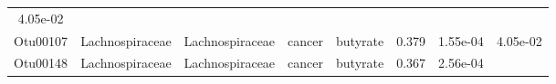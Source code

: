\documentclass[11pt,]{article}
\begin{document}
\begin{longtable}[]{@{}cccccccc@{}}
\begin{minipage}[t]{0.08\columnwidth}
4.05e-02\strut
\end{minipage}\tabularnewline
\begin{minipage}[t]{0.08\columnwidth}\centering\strut
Otu00107\strut
\end{minipage} & \begin{minipage}[t]{0.15\columnwidth}\centering\strut
Lachnospiraceae\strut
\end{minipage} & \begin{minipage}[t]{0.15\columnwidth}\centering\strut
Lachnospiraceae\strut
\end{minipage} & \begin{minipage}[t]{0.08\columnwidth}\centering\strut
cancer\strut
\end{minipage} & \begin{minipage}[t]{0.09\columnwidth}\centering\strut
butyrate\strut
\end{minipage} & \begin{minipage}[t]{0.07\columnwidth}\centering\strut
0.379\strut
\end{minipage} & \begin{minipage}[t]{0.08\columnwidth}\centering\strut
1.55e-04\strut
\end{minipage} & \begin{minipage}[t]{0.08\columnwidth}\centering\strut
4.05e-02\strut
\end{minipage}\tabularnewline
\begin{minipage}[t]{0.08\columnwidth}\centering\strut
Otu00148\strut
\end{minipage} & \begin{minipage}[t]{0.15\columnwidth}\centering\strut
Lachnospiraceae\strut
\end{minipage} & \begin{minipage}[t]{0.15\columnwidth}\centering\strut
Lachnospiraceae\strut
\end{minipage} & \begin{minipage}[t]{0.08\columnwidth}\centering\strut
cancer\strut
\end{minipage} & \begin{minipage}[t]{0.09\columnwidth}\centering\strut
butyrate\strut
\end{minipage} & \begin{minipage}[t]{0.07\columnwidth}\centering\strut
0.367\strut
\end{minipage} & \begin{minipage}[t]{0.08\columnwidth}\centering\strut
2.56e-04\strut
\end{minipage} & \begin{minipage}[t]{0.08\columnwidth}\centering\strut

\end{minipage}
\end{longtable}
\end{document}
